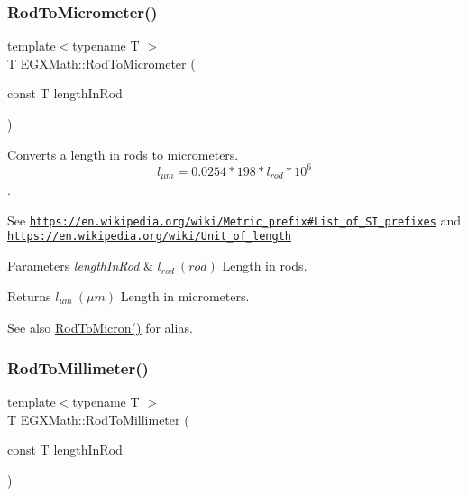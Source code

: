 \subsubsection{\texorpdfstring{Rod\+To\+Micrometer()}{RodToMicrometer()}}
{\footnotesize\ttfamily template$<$typename T $>$ \\
T E\+G\+X\+Math\+::\+Rod\+To\+Micrometer (\begin{DoxyParamCaption}\item[{const T}]{length\+In\+Rod }\end{DoxyParamCaption})}



Converts a length in rods to micrometers. \[ l_{\mu m}=0.0254 * 198 * l_{rod} * 10^{6} \]. 

See \href{https://en.wikipedia.org/wiki/Metric_prefix#List_of_SI_prefixes}{\tt https\+://en.\+wikipedia.\+org/wiki/\+Metric\+\_\+prefix\#\+List\+\_\+of\+\_\+\+S\+I\+\_\+prefixes} and \href{https://en.wikipedia.org/wiki/Unit_of_length}{\tt https\+://en.\+wikipedia.\+org/wiki/\+Unit\+\_\+of\+\_\+length} 
\begin{DoxyParams}{Parameters}
{\em length\+In\+Rod} & $ l_{rod}\ (rod)$ Length in rods. \\
\hline
\end{DoxyParams}
\begin{DoxyReturn}{Returns}
$ l_{\mu m}\ (\mu m)$ Length in micrometers. 
\end{DoxyReturn}
\begin{DoxySeeAlso}{See also}
\mbox{\hyperlink{group___e_g_x_math-_conversions-_length_conversions-_surveyors-_rod-_non-_s_i_ga91daf7bb89d486f6c8523a5436e5599d}{Rod\+To\+Micron()}} for alias. 
\end{DoxySeeAlso}
\mbox{\label{group___e_g_x_math-_conversions-_length_conversions-_surveyors-_rod-_s_i_gac99fbcf597375add3d57bcf16d64a890}} 
\subsubsection{\texorpdfstring{Rod\+To\+Millimeter()}{RodToMillimeter()}}
{\footnotesize\ttfamily template$<$typename T $>$ \\
T E\+G\+X\+Math\+::\+Rod\+To\+Millimeter (\begin{DoxyParamCaption}\item[{const T}]{length\+In\+Rod }\end{DoxyParamCaption})}



